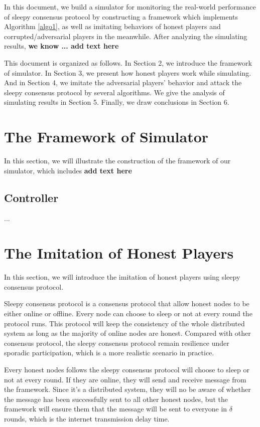 \documentclass{llncs}
\begin{document}
In this document, we build a simulator for monitoring the real-world performance of sleepy consensus protocol by constructing a framework which implements Algorithm \ref{algo1}, as well as imitating behaviors of honest players and corrupted/adversarial players in the meanwhile. After analyzing the simulating results, \textbf{we know ... add text here}

This document is organized as follows. In Section 2, we introduce the framework of simulator. In Section 3, we present how honest players work while simulating. And in Section 4, we imitate the adversarial players' behavior and attack the sleepy consensus protocol by several algorithms. We give the analysis of simulating results in Section 5. Finally, we draw conclusions in Section 6.

\section{The Framework of Simulator}
%
In this section, we will illustrate the construction of the framework of our simulator, which includes \textbf{add text here}

%
\subsection{Controller}
...

\section{The Imitation of Honest Players}
\quad  In this section, we will introduce the imitation of honest players using sleepy consensus protocol.

Sleepy consensus protocol is a consensus protocol that allow honest nodes to be either online or offline. Every node can choose to sleep or not at every round the protocol runs. This protocol will keep the consistency of the whole distributed system as long as the majority of online nodes are honest. Compared with other consensus protocol, the sleepy consensus protocol remain resilience under sporadic participation, which is a more realistic scenario in practice.

Every honest nodes follows the sleepy consensus protocol will choose to sleep or not at every round. If they are online, they will send and receive message from the framework. Since it's a distributed system, they will no be aware of whether the message has been successfully sent to all other honest nodes, but the framework will ensure them that the message will be sent to everyone in $\delta $ rounds, which is the internet transmission delay time.
\end{document}
